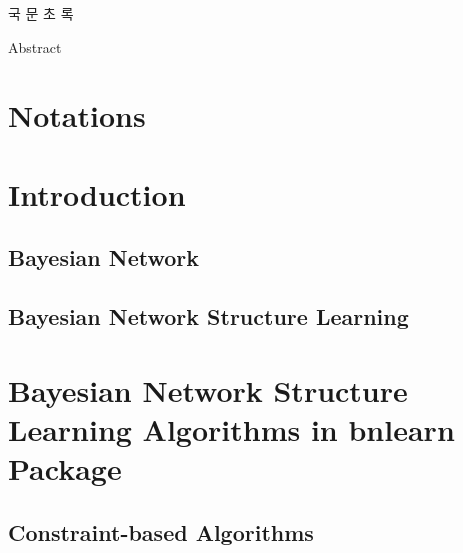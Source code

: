 \documentclass[12pt,a4paper,oneside]{book}
\theoremstyle{plain}
\theoremstyle{definition}
\theoremstyle{remark}
\theoremstyle{definition}
\numberwithin{equation}{chapter}
\begin{document}
\newpage{}

\begin{center}
{\Large 국 문 초 록}
\end{center}




\newpage{}

\begin{center}
{\Large Abstract}
\end{center}

 \tableofcontents
 \newpage
 \listoftables
 \newpage
 \listoffigures

\newpage

 \setcounter{page}{1}

\chapter*{Notations}





\chapter{Introduction}

\section{Bayesian Network}


\section{Bayesian Network Structure Learning}






\chapter{Bayesian Network Structure Learning Algorithms in bnlearn Package}


%
\section{Constraint-based Algorithms}
\end{document}
